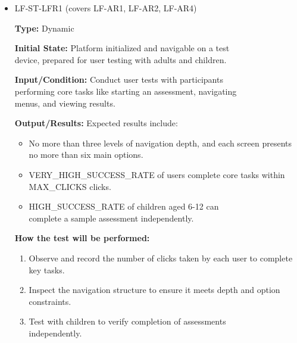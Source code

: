 \documentclass[12pt, titlepage]{article}
\begin{document}
\begin{itemize} 
  \item LF-ST-LFR1 (covers LF-AR1, LF-AR2, LF-AR4) 
  \begin{mdframed}[linewidth=0.5mm] 
    \textbf{Type:} Dynamic \par 
    \textbf{Initial State:} Platform initialized and navigable on a test \\device, prepared for user testing with adults and children. \par 
    \textbf{Input/Condition:} Conduct user tests with participants \\performing core tasks like starting an assessment, navigating \\menus, and viewing results. \par 
    \textbf{Output/Results:} Expected results include: 
    \begin{itemize} 
      \item No more than three levels of navigation depth, and each screen presents no more than six main options. 
      \item VERY\_HIGH\_SUCCESS\_RATE of users complete core tasks within\\
      MAX\_CLICKS clicks. 
      \item HIGH\_SUCCESS\_RATE of children aged 6-12 can \\complete a sample assessment independently. 
    \end{itemize} \par \textbf{How the test will be performed:} 
    \begin{enumerate}[noitemsep] 
      \item Observe and record the number of clicks taken by each user to complete key tasks. 
      \item Inspect the navigation structure to ensure it meets depth and option \\ constraints. 
      \item Test with children to verify completion of assessments \\independently. 
    \end{enumerate} 
  \end{mdframed}


\end{itemize}
\end{document}
